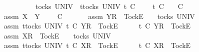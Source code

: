\begin{isabellebody}
\ \ \ \ \ \ \ \ {\isasymrho}\ {\isasymin}\ tocks\ UNIV\ {\isasymLongrightarrow}\ {\isasymforall}t{\isasymin}tocks\ UNIV{\isachardot}\ t\ {\isasymle}\isactrlsub C\ {\isasymrho}\ {\isacharat}\ {\isasymsigma}{\isacharprime}\ {\isasymlongrightarrow}\ t\ {\isasymle}\isactrlsub C\ {\isasymrho}\ {\isasymLongrightarrow}\ {\isasymrho}\ {\isasymlesssim}\isactrlsub C\ {\isasymsigma}{\isacharprime}{\isacharprime}{\isacharparenright}{\isachardoublequoteclose}\isanewline
\ \ \isamarkupfalse%
\ assm{}{\isacharcolon}\ {\isachardoublequoteopen}X\ {\isasymsubseteq}\ Y\ {\isasymand}\ {\isasymrho}\ {\isacharat}\ {\isasymsigma}{\isacharprime}\ {\isasymlesssim}\isactrlsub C\ {\isasymsigma}{\isacharprime}{\isacharprime}\ {\isacharat}\ {\isasymsigma}{\isachardoublequoteclose}\isanewline
\ \ \isamarkupfalse%
\ assm{}{\isacharcolon}\ {\isachardoublequoteopen}{\isacharbrackleft}Y{\isacharbrackright}\isactrlsub R\ {\isacharhash}\ {\isacharbrackleft}Tock{\isacharbrackright}\isactrlsub E\ {\isacharhash}\ {\isasymsigma}{\isacharprime}{\isacharprime}\ {\isasymin}\ tocks\ UNIV{\isachardoublequoteclose}\isanewline
\ \ \isamarkupfalse%
\ assm{}{\isacharcolon}\ {\isachardoublequoteopen}{\isasymforall}t{\isasymin}tocks\ UNIV{\isachardot}\ t\ {\isasymle}\isactrlsub C\ {\isacharbrackleft}Y{\isacharbrackright}\isactrlsub R\ {\isacharhash}\ {\isacharbrackleft}Tock{\isacharbrackright}\isactrlsub E\ {\isacharhash}\ {\isasymsigma}{\isacharprime}{\isacharprime}\ {\isacharat}\ {\isasymsigma}\ {\isasymlongrightarrow}\ t\ {\isasymle}\isactrlsub C\ {\isacharbrackleft}Y{\isacharbrackright}\isactrlsub R\ {\isacharhash}\ {\isacharbrackleft}Tock{\isacharbrackright}\isactrlsub E\ {\isacharhash}\ {\isasymsigma}{\isacharprime}{\isacharprime}{\isachardoublequoteclose}\isanewline
\ \ \isamarkupfalse%
\ assm{}{\isacharcolon}\ {\isachardoublequoteopen}{\isacharbrackleft}X{\isacharbrackright}\isactrlsub R\ {\isacharhash}\ {\isacharbrackleft}Tock{\isacharbrackright}\isactrlsub E\ {\isacharhash}\ {\isasymrho}\ {\isasymin}\ tocks\ UNIV{\isachardoublequoteclose}\isanewline
\ \ \isamarkupfalse%
\ assm{}{\isacharcolon}\ {\isachardoublequoteopen}{\isasymforall}t{\isasymin}tocks\ UNIV{\isachardot}\ t\ {\isasymle}\isactrlsub C\ {\isacharbrackleft}X{\isacharbrackright}\isactrlsub R\ {\isacharhash}\ {\isacharbrackleft}Tock{\isacharbrackright}\isactrlsub E\ {\isacharhash}\ {\isasymrho}\ {\isacharat}\ {\isasymsigma}{\isacharprime}\ {\isasymlongrightarrow}\ t\ {\isasymle}\isactrlsub C\ {\isacharbrackleft}X{\isacharbrackright}\isactrlsub R\ {\isacharhash}\ {\isacharbrackleft}Tock{\isacharbrackright}\isactrlsub E\ {\isacharhash}\ {\isasymrho}{\isachardoublequoteclose}\isanewline

\end{isabellebody}
